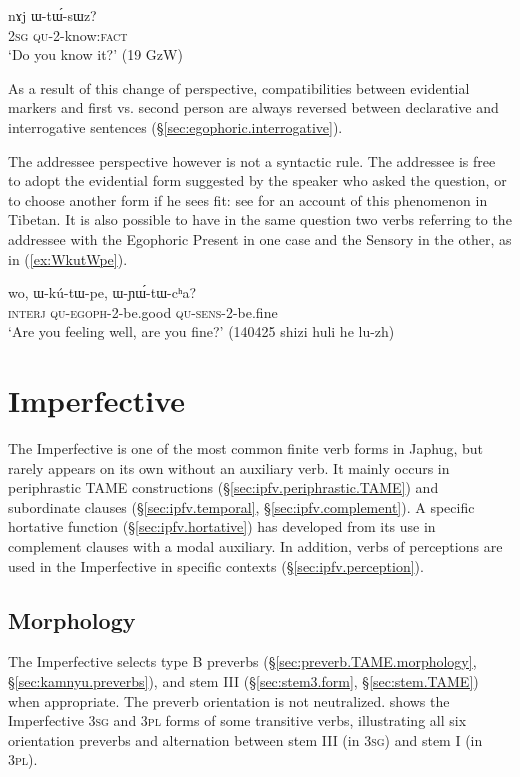 \begin{exe}
\ex \label{ex:WtWsWz}
\gll nɤj ɯ-tɯ́-sɯz? \\
\textsc{2sg} \textsc{qu}-2-know:\textsc{fact} \\
\glt `Do you know it?' (19 GzW)  
\end{exe} 

As a result of this change of perspective, compatibilities between evidential markers and first vs. second person are always reversed between declarative and interrogative sentences  (§\ref{sec:egophoric.interrogative}).

The addressee perspective however is not a syntactic rule. The addressee is free to adopt the evidential form suggested by the speaker who asked the question, or to choose another form if he sees fit: see \citet{garrett07symbiosis} for an account of this phenomenon in Tibetan. It is also possible to have in the same question two verbs referring to the addressee with the Egophoric Present in one case and the Sensory in the other, as in (\ref{ex:WkutWpe}). 

\begin{exe}
\ex \label{ex:WkutWpe}
\gll wo, ɯ-kú-tɯ-pe, ɯ-ɲɯ́-tɯ-cʰa? \\
\textsc{interj} \textsc{qu}-\textsc{egoph}-2-be.good \textsc{qu}-\textsc{sens}-2-be.fine \\
\glt `Are you feeling well, are you fine?' (140425 shizi huli he lu-zh)
\end{exe}

  \section{Imperfective} \label{sec:imperfective}
 The Imperfective is one of the most common finite verb forms in Japhug, but rarely appears on its own without an auxiliary verb. It mainly occurs in periphrastic TAME constructions (§\ref{sec:ipfv.periphrastic.TAME}) and subordinate clauses (§\ref{sec:ipfv.temporal}, §\ref{sec:ipfv.complement}). A specific hortative function (§\ref{sec:ipfv.hortative}) has developed from its use in complement clauses with a modal auxiliary. In addition, verbs of perceptions are used in the Imperfective in specific contexts (§\ref{sec:ipfv.perception}).
  
  
  \subsection{Morphology} \label{sec:ipfv.morphology}
The Imperfective selects type B preverbs (§\ref{sec:preverb.TAME.morphology}, §\ref{sec:kamnyu.preverbs}), and stem III (§\ref{sec:stem3.form}, §\ref{sec:stem.TAME}) when appropriate. The preverb orientation is not neutralized.  shows the Imperfective \textsc{3sg}\flobv{} and \textsc{3pl}\flobv{} forms of some transitive verbs, illustrating all six orientation preverbs and alternation between stem III (in \textsc{3sg}\flobv{}) and stem I (in \textsc{3pl}\flobv{}).
 
